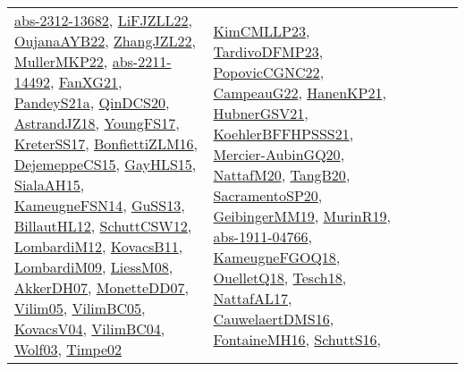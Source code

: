 {\begin{longtable}{llp{6cm}p{6cm}p{6cm}}
\href{articles/abs-2312-13682.pdf}{abs-2312-13682}\cite{abs-2312-13682}, \href{papers/LiFJZLL22.pdf}{LiFJZLL22}\cite{LiFJZLL22}, \href{papers/OujanaAYB22.pdf}{OujanaAYB22}\cite{OujanaAYB22}, \href{papers/ZhangJZL22.pdf}{ZhangJZL22}\cite{ZhangJZL22}, \href{articles/MullerMKP22.pdf}{MullerMKP22}\cite{MullerMKP22}, \href{articles/abs-2211-14492.pdf}{abs-2211-14492}\cite{abs-2211-14492}, \href{articles/FanXG21.pdf}{FanXG21}\cite{FanXG21}, \href{articles/PandeyS21a.pdf}{PandeyS21a}\cite{PandeyS21a}, \href{articles/QinDCS20.pdf}{QinDCS20}\cite{QinDCS20}, \href{papers/AstrandJZ18.pdf}{AstrandJZ18}\cite{AstrandJZ18}, \href{papers/YoungFS17.pdf}{YoungFS17}\cite{YoungFS17}, \href{articles/KreterSS17.pdf}{KreterSS17}\cite{KreterSS17}, \href{papers/BonfiettiZLM16.pdf}{BonfiettiZLM16}\cite{BonfiettiZLM16}, \href{papers/DejemeppeCS15.pdf}{DejemeppeCS15}\cite{DejemeppeCS15}, \href{papers/GayHLS15.pdf}{GayHLS15}\cite{GayHLS15}, \href{papers/SialaAH15.pdf}{SialaAH15}\cite{SialaAH15}, \href{articles/KameugneFSN14.pdf}{KameugneFSN14}\cite{KameugneFSN14}, \href{papers/GuSS13.pdf}{GuSS13}\cite{GuSS13}, \href{papers/BillautHL12.pdf}{BillautHL12}\cite{BillautHL12}, \href{papers/SchuttCSW12.pdf}{SchuttCSW12}\cite{SchuttCSW12}, \href{articles/LombardiM12.pdf}{LombardiM12}\cite{LombardiM12}, \href{articles/KovacsB11.pdf}{KovacsB11}\cite{KovacsB11}, \href{papers/LombardiM09.pdf}{LombardiM09}\cite{LombardiM09}, \href{articles/LiessM08.pdf}{LiessM08}\cite{LiessM08}, \href{papers/AkkerDH07.pdf}{AkkerDH07}\cite{AkkerDH07}, \href{papers/MonetteDD07.pdf}{MonetteDD07}\cite{MonetteDD07}, \href{papers/Vilim05.pdf}{Vilim05}\cite{Vilim05}, \href{articles/VilimBC05.pdf}{VilimBC05}\cite{VilimBC05}, \href{papers/KovacsV04.pdf}{KovacsV04}\cite{KovacsV04}, \href{papers/VilimBC04.pdf}{VilimBC04}\cite{VilimBC04}, \href{papers/Wolf03.pdf}{Wolf03}\cite{Wolf03}, \href{articles/Timpe02.pdf}{Timpe02}\cite{Timpe02} & \href{papers/KimCMLLP23.pdf}{KimCMLLP23}\cite{KimCMLLP23}, \href{papers/TardivoDFMP23.pdf}{TardivoDFMP23}\cite{TardivoDFMP23}, \href{papers/PopovicCGNC22.pdf}{PopovicCGNC22}\cite{PopovicCGNC22}, \href{articles/CampeauG22.pdf}{CampeauG22}\cite{CampeauG22}, \href{papers/HanenKP21.pdf}{HanenKP21}\cite{HanenKP21}, \href{articles/HubnerGSV21.pdf}{HubnerGSV21}\cite{HubnerGSV21}, \href{articles/KoehlerBFFHPSSS21.pdf}{KoehlerBFFHPSSS21}\cite{KoehlerBFFHPSSS21}, \href{papers/Mercier-AubinGQ20.pdf}{Mercier-AubinGQ20}\cite{Mercier-AubinGQ20}, \href{papers/NattafM20.pdf}{NattafM20}\cite{NattafM20}, \href{papers/TangB20.pdf}{TangB20}\cite{TangB20}, \href{articles/SacramentoSP20.pdf}{SacramentoSP20}\cite{SacramentoSP20}, \href{papers/GeibingerMM19.pdf}{GeibingerMM19}\cite{GeibingerMM19}, \href{papers/MurinR19.pdf}{MurinR19}\cite{MurinR19}, \href{articles/abs-1911-04766.pdf}{abs-1911-04766}\cite{abs-1911-04766}, \href{papers/KameugneFGOQ18.pdf}{KameugneFGOQ18}\cite{KameugneFGOQ18}, \href{papers/OuelletQ18.pdf}{OuelletQ18}\cite{OuelletQ18}, \href{papers/Tesch18.pdf}{Tesch18}\cite{Tesch18}, \href{articles/NattafAL17.pdf}{NattafAL17}\cite{NattafAL17}, \href{papers/CauwelaertDMS16.pdf}{CauwelaertDMS16}\cite{CauwelaertDMS16}, \href{papers/FontaineMH16.pdf}{FontaineMH16}\cite{FontaineMH16}, \href{papers/SchuttS16.pdf}{SchuttS16}\cite{SchuttS16}, 
\end{longtable}}
